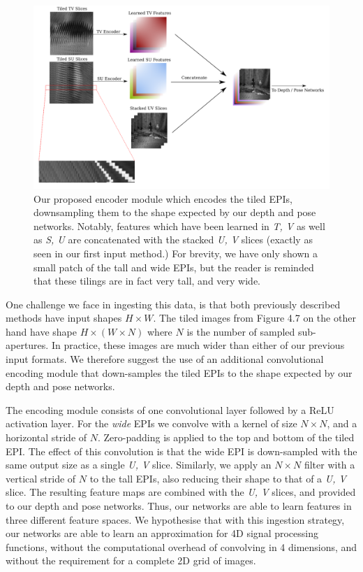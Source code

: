 \begin{figure}[H]
    \centering 
    \includegraphics[width=6in]{images/encoderpipewithinset.png}
    \caption[An encoder module for extracting features from EPIs]{Our proposed encoder module which encodes the tiled EPIs, downsampling them to the shape expected by our depth and pose networks. Notably, features which have been learned in \textit{T, V} as well as \textit{S, U} are concatenated with the stacked \textit{U, V} slices (exactly as seen in our first input method.) For brevity, we have only shown a small patch of the tall and wide EPIs, but the reader is reminded that these tilings are in fact very tall, and very wide.}
\end{figure}

One challenge we face in ingesting this data, is that both previously described methods have input shapes $H \times W$. The tiled images from Figure 4.7 on the other hand have shape $H \times (W \times N)$ where $N$ is the number of sampled sub-apertures. In practice, these images are much wider than either of our previous input formats. We therefore suggest the use of an additional convolutional encoding module that down-samples the tiled EPIs to the shape expected by our depth and pose networks.


The encoding module consists of one convolutional layer followed by a ReLU activation layer. For the \textit{wide} EPIs we convolve with a kernel of size $N \times N$, and a horizontal stride of $N$. Zero-padding is applied to the top and bottom of the tiled EPI. The effect of this convolution is that the wide EPI is down-sampled with the same output size as a single \textit{U, V} slice. Similarly, we apply an $N \times N$ filter with a vertical stride of $N$ to the tall EPIs, also reducing their shape to that of a \textit{U, V} slice. The resulting feature maps are combined with the \textit{U, V} slices, and provided to our depth and pose networks. Thus, our networks are able to learn features in three different feature spaces. We hypothesise that with this ingestion strategy, our networks are able to learn an approximation for 4D signal processing functions, without the computational overhead of convolving in 4 dimensions, and without the requirement for a complete 2D grid of images.


